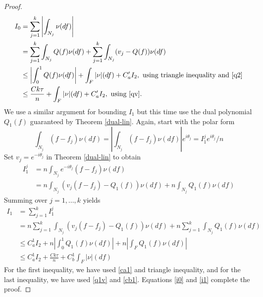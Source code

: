 \begin{proof}
\begin{align}
\nonumber I_0 &= \sum_{j=1}^k \left| \int_{N_j} \nu(df) \right|\\
\nonumber & = \sum_{j=1}^k\int_{N_j} Q ( f) \nu ( d f) + 
\sum_{j=1}^k \int_{N_j} ( v_j - Q ( f)) \nu ( d f)\\
\nonumber & \leq \left|\int_0^1 Q(f) \nu(df) \right| + \int_F|\nu|(df) + C_a' I_2, \text{ using triangle inequality and \eqref{q2}}\\
\label{i0} & \leq \frac{C k \tau}{n} + \int_F|\nu|(df) + C_a' I_2, \text{ using \eqref{qv}}.
\end{align}
We use a similar argument for bounding $I_1$ but this time use the dual polynomial $Q_1(f)$ guaranteed by Theorem \ref{dual-lin}. Again, start with the polar form
\[
  \int_{N_j} (f - f_j) \nu ( d f)  =  \left|
  \int_{N_j} (f - f_j) \nu ( d f) \right| e^{i \theta_j} = I_1^j e^{i\theta_j}/n
\]
Set $v_j = e^{-i \theta_j}$ in Theorem \ref{dual-lin} to obtain
{
\begin{align*}
  I_1^j & = 
  n\int_{N_j} e^{- i \theta_j} ( f - f_j) \nu ( d f)\\
  & =  n \int_{N_j} (v_j (
  f - f_j) - Q_1 ( f)) \nu ( d f)  + n\int_{N_j} Q_1 ( f) \nu ( d f)
\end{align*}
}
Summing over $j=1,\ldots,k$ yields
{
\begin{align}
\nonumber I_1 &= \sum_{j=1}^k I_1^j\\
\nonumber &= n \sum_{j=1}^k \int_{N_j} (v_j (
  f - f_j) - Q_1 ( f)) \nu ( d f) + n\sum_{j=1}^k\int_{N_j} Q_1 ( f) \nu ( d f)\\
\nonumber &\leq C_a^1 I_2 + n\left|\int_0^1 Q_1(f) \nu(df)\right| +  n\left |\int_F Q_1(f) \nu(df)\right |\\
\label{i1}& \leq C_a^1 I_2 + \frac{C k \tau}{n} +  C_b^1 \int_F|\nu|(df)
\end{align}
}
For the first inequality, we have used \eqref{ca1} and triangle inequality, and for the last inequality, we have used \eqref{q1v} and \eqref{cb1}. Equations \eqref{i0} and \eqref{i1} complete the proof.
\end{proof}	

